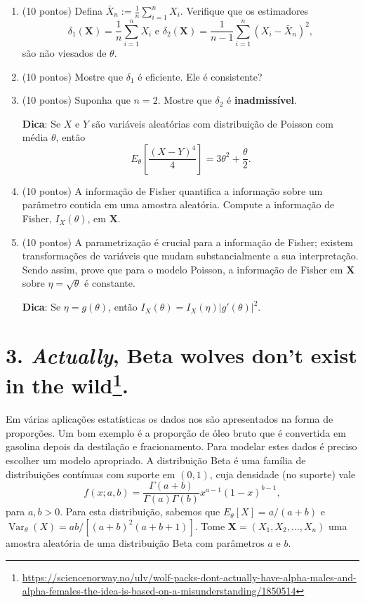 \documentclass[a4paper,10pt, notitlepage]{report}
\newcommand{\vr}{\operatorname{Var}} %
\newcommand{\rs}{X_1, X_2, \ldots, X_n} %
\newcommand{\bX}{\boldsymbol{X}} %
\newif\ifanswers
\begin{document}
\begin{enumerate}[label=\alph*)] 
	\item (10 pontos) Defina $\bar{X}_{n} := \frac{1}{n} \sum_{i=1}^n X_{i}$.
 Verifique que os estimadores 
		\begin{equation*} 
			\delta_{1}(\mathbf{X}) = \frac{1}{n} \sum_{i=1}^n X_{i} \text{ e } \delta_{2}(\mathbf{X}) = \frac{1}{n - 1}  \sum_{i=1}^n (X_{i} - \bar{X}_{n})^{2},  
		\end{equation*} 
		\noindent são não viesados de $\theta$. 
	\item (10 pontos)  Mostre que $\delta_{1}$ é eficiente.
 Ele é consistente? 
	\item (10 pontos)  Suponha que $n = 2$.
 Mostre que $\delta_{2}$ é \textbf{inadmissível}.
 
 \textbf{Dica}: Se $X$ e $Y$ são variáveis aleatórias com distribuição de Poisson com média $\theta$, então 
	\begin{equation*}
	    E_\theta\left[\frac{(X - Y)^{4}}{4}\right] = 3\theta^{2} + \frac{\theta}{2}. 
	\end{equation*}
 	\item (10 pontos) A informação de Fisher quantifica a informação sobre um parâmetro contida em uma amostra aleatória.
 Compute a informação de Fisher, $I_{X}(\theta)$, em $\mathbf{X}$. 
	\item (10 pontos)  A parametrização é crucial para a informação de Fisher; existem transformações de variáveis que mudam substancialmente a sua interpretação.
 Sendo assim, prove que para o modelo Poisson, a informação de Fisher em $\mathbf{X}$ sobre $\eta = \sqrt{\theta}$ é constante.
 
 \textbf{Dica}: Se $\eta = g(\theta)$, então $I_{X}(\theta) = I_{X}(\eta) |g'(\theta)|^{2}$. 
\end{enumerate} 
\ifanswers

\fi

\section*{3. \textit{Actually}, Beta wolves don't exist in the wild\footnote{\url{https://sciencenorway.no/ulv/wolf-packs-dont-actually-have-alpha-males-and-alpha-females-the-idea-is-based-on-a-misunderstanding/1850514}}.}

Em várias aplicações estatísticas os dados nos são apresentados na forma de proporções.
Um bom exemplo é a proporção de óleo bruto que é convertida em gasolina depois da destilação e fracionamento.
Para modelar estes dados é preciso escolher um modelo apropriado.
A distribuição Beta é uma família de distribuições contínuas com suporte em $(0, 1)$, cuja densidade (no suporte) vale
\begin{equation*}
f(x; a, b) = \frac{\Gamma(a + b)}{\Gamma(a)\Gamma(b)} x^{a-1} (1-x)^{b-1},
\end{equation*}
para $a, b > 0$.
Para esta distribuição, sabemos que $E_\theta[X] = a/(a + b)$ e $\vr_\theta(X) = ab/[(a+b)^2(a+b+1)]$.
Tome $\bX = (\rs)$ uma amostra aleatória de uma distribuição Beta com parâmetros $a$ e $b$.
\end{document}
